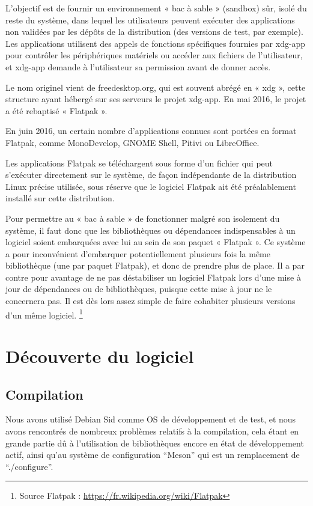 \documentclass[12pt]{report}
\begin{document}
L'objectif est de fournir un environnement « bac à sable » (sandbox)
sûr, isolé du reste du système, dans lequel les utilisateurs peuvent
exécuter des applications non validées par les dépôts de la
distribution (des versions de test, par exemple). Les applications
utilisent des appels de fonctions spécifiques fournies par xdg-app
pour contrôler les périphériques matériels ou accéder aux fichiers de
l'utilisateur, et xdg-app demande à l'utilisateur sa permission avant
de donner accès.

Le nom originel vient de freedesktop.org, qui est souvent abrégé en «
xdg », cette structure ayant hébergé sur ses serveurs le projet
xdg-app. En mai 2016, le projet a été rebaptisé « Flatpak ».

En juin 2016, un certain nombre d'applications connues sont portées en
format Flatpak, comme MonoDevelop, GNOME Shell, Pitivi ou LibreOffice.

Les applications Flatpak se téléchargent sous forme d'un fichier qui
peut s’exécuter directement sur le système, de façon indépendante de
la distribution Linux précise utilisée, sous réserve que le logiciel
Flatpak ait été préalablement installé sur cette distribution.

Pour permettre au « bac à sable » de fonctionner malgré son isolement
du système, il faut donc que les bibliothèques ou dépendances
indispensables à un logiciel soient embarquées avec lui au sein de son
paquet « Flatpak ». Ce système a pour inconvénient d'embarquer
potentiellement plusieurs fois la même bibliothèque (une par paquet
Flatpak), et donc de prendre plus de place. Il a par contre pour
avantage de ne pas déstabiliser un logiciel Flatpak lors d'une mise à
jour de dépendances ou de bibliothèques, puisque cette mise à jour ne
le concernera pas. Il est dès lors assez simple de faire cohabiter
plusieurs versions d'un même logiciel.
\footnote{Source Flatpak : \url{https://fr.wikipedia.org/wiki/Flatpak}}

\section{Découverte du logiciel}
\subsection{Compilation}
Nous avons utilisé Debian Sid comme OS de développement et de test,
et nous avons rencontrés de nombreux problèmes relatifs à la compilation,
cela étant en grande partie dû à l'utilisation de bibliothèques encore en
état de développement actif, ainsi qu'au système de configuration
``Meson'' qui est un remplacement de ``./configure''.\\
\end{document}
